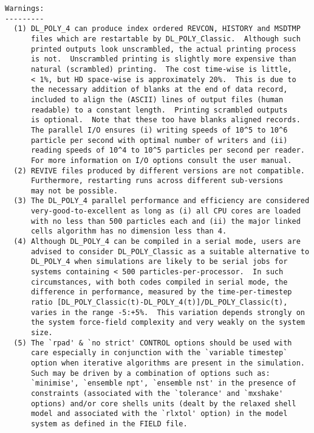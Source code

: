 \begin{verbatim}
Warnings:
---------
  (1) DL_POLY_4 can produce index ordered REVCON, HISTORY and MSDTMP
      files which are restartable by DL_POLY_Classic.  Although such
      printed outputs look unscrambled, the actual printing process
      is not.  Unscrambled printing is slightly more expensive than
      natural (scrambled) printing.  The cost time-wise is little,
      < 1%, but HD space-wise is approximately 20%.  This is due to
      the necessary addition of blanks at the end of data record,
      included to align the (ASCII) lines of output files (human
      readable) to a constant length.  Printing scrambled outputs
      is optional.  Note that these too have blanks aligned records.
      The parallel I/O ensures (i) writing speeds of 10^5 to 10^6
      particle per second with optimal number of writers and (ii)
      reading speeds of 10^4 to 10^5 particles per second per reader.
      For more information on I/O options consult the user manual.
  (2) REVIVE files produced by different versions are not compatible.
      Furthermore, restarting runs across different sub-versions
      may not be possible.
  (3) The DL_POLY_4 parallel performance and efficiency are considered
      very-good-to-excellent as long as (i) all CPU cores are loaded
      with no less than 500 particles each and (ii) the major linked
      cells algorithm has no dimension less than 4.
  (4) Although DL_POLY_4 can be compiled in a serial mode, users are
      advised to consider DL_POLY_Classic as a suitable alternative to
      DL_POLY_4 when simulations are likely to be serial jobs for
      systems containing < 500 particles-per-processor.  In such
      circumstances, with both codes compiled in serial mode, the
      difference in performance, measured by the time-per-timestep
      ratio [DL_POLY_Classic(t)-DL_POLY_4(t)]/DL_POLY_Classic(t),
      varies in the range -5:+5%.  This variation depends strongly on
      the system force-field complexity and very weakly on the system
      size.
  (5) The `rpad' & `no strict' CONTROL options should be used with
      care especially in conjunction with the `variable timestep`
      option when iterative algorithms are present in the simulation.
      Such may be driven by a combination of options such as:
      `minimise', `ensemble npt', `ensemble nst' in the presence of
      constraints (associated with the `tolerance' and `mxshake'
      options) and/or core shells units (dealt by the relaxed shell
      model and associated with the `rlxtol' option) in the model
      system as defined in the FIELD file.


\end{verbatim}
